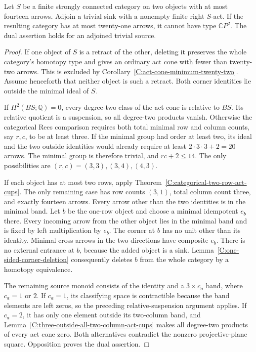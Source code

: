 \begin{proposition}\label{C:strong-pair-fourteen-source-cone}
Let $S$ be a finite strongly connected category on two objects
with at most fourteen arrows. Adjoin a trivial sink with a
nonempty finite right $S$-act. If the resulting category has
at most twenty-one arrows, it cannot have type $\mathbb CP^2$.
The dual assertion holds for an adjoined trivial source.
\end{proposition}
\begin{proof}
If one object of $S$ is a retract of the other, deleting it
preserves the whole category's homotopy type and gives an
ordinary act cone with fewer than twenty-two arrows. This is
excluded by Corollary~\ref{C:act-cone-minimum-twenty-two}.
Assume henceforth that neither object is such a retract.
Both corner identities lie outside the minimal ideal of $S$.

If $H^2(BS;\mathbb Q)=0$, every degree-two class of the act cone
is relative to $BS$. Its relative quotient is a suspension, so
all degree-two products vanish. Otherwise the categorical Rees
comparison requires both total minimal row and column counts,
say $r,c$, to be at least three. If the minimal group had order
at least two, its ideal and the two outside identities would
already require at least $2\cdot3\cdot3+2=20$ arrows.
The minimal group is therefore trivial, and $rc+2\leq14$.
The only possibilities are $(r,c)=(3,3),(3,4),(4,3)$.

If each object has at most two rows, apply
Theorem~\ref{C:categorical-two-row-act-cups}.
The only remaining case has row counts $(3,1)$, total column
count three, and exactly fourteen arrows. Every arrow other
than the two identities is in the minimal band. Let $b$ be
the one-row object and choose a minimal idempotent $e_b$ there.
Every incoming arrow from the other object lies in the minimal
band and is fixed by left multiplication by $e_b$. The corner
at $b$ has no unit other than its identity. Minimal cross arrows
in the two directions have composite $e_b$.
There is no external entrance at $b$, because the added object
is a sink. Lemma~\ref{C:one-sided-corner-deletion} consequently
deletes $b$ from the whole category by a homotopy equivalence.

The remaining source monoid consists of the identity and a
$3\times c_a$ band, where $c_a=1$ or $2$. If $c_a=1$, its
classifying space is contractible because the band elements
are left zeros, so the preceding relative-suspension argument
applies. If $c_a=2$, it has only one element outside its
two-column band, and
Lemma~\ref{C:three-outside-all-two-column-act-cups} makes all
degree-two products of every act cone zero. Both alternatives
contradict the nonzero projective-plane square. Opposition
proves the dual assertion.
\end{proof}


